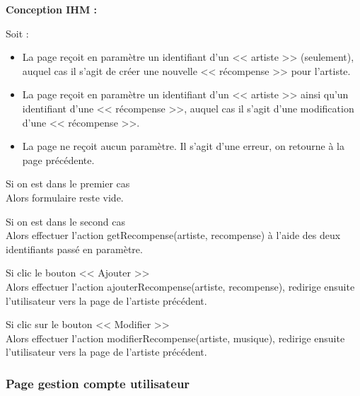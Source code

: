 \begin{paragraphe}
			\begin{paragraphe}
				\textbf{Conception IHM :}
			\end{paragraphe}

			\begin{paragraphe}
				Soit :
				\begin{itemize}
					\item La page reçoit en paramètre un identifiant d'un << artiste >> (seulement), auquel cas il s'agit de créer une nouvelle << récompense >> pour l'artiste.
					\item La page reçoit en paramètre un identifiant d'un << artiste >> ainsi qu'un identifiant d'une << récompense >>, auquel cas il s'agit d'une modification d'une << récompense >>.
					\item La page ne reçoit aucun paramètre. Il s'agit d'une erreur, on retourne à la page précédente.
				\end{itemize}
			\end{paragraphe}


			\begin{paragraphe}
				Si on est dans le premier cas \\
				Alors formulaire reste vide.
			\end{paragraphe}

			\begin{paragraphe}
				Si on est dans le second cas \\
				Alors effectuer l'action getRecompense(artiste, recompense) à l'aide des deux identifiants passé en paramètre.
			\end{paragraphe}

			\begin{paragraphe}
				Si clic le bouton << Ajouter >> \\
				Alors effectuer l'action ajouterRecompense(artiste, recompense), redirige ensuite l'utilisateur vers la page de l'artiste précédent.
			\end{paragraphe}

			\begin{paragraphe}
				Si clic sur le bouton << Modifier >> \\
				Alors effectuer l'action modifierRecompense(artiste, musique), redirige ensuite l'utilisateur vers la page de l'artiste précédent.
			\end{paragraphe}

		\subsubsection{Page gestion compte utilisateur}


\end{paragraphe}
